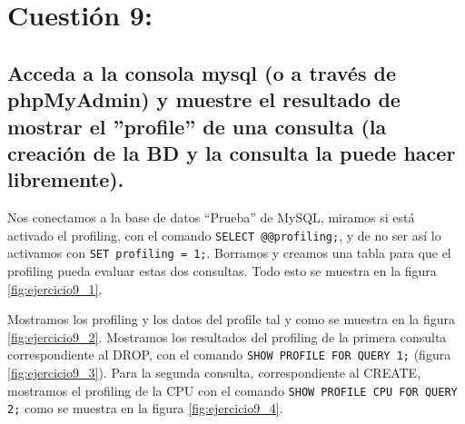 



\section{Cuestión 9:}

\subsection{Acceda a la consola mysql (o a través de phpMyAdmin) y muestre el resultado de mostrar el ”profile” de una consulta (la creación de la BD y la consulta la puede hacer libremente).}

Nos conectamos a la base de datos ``Prueba'' de MySQL, miramos si está activado el profiling, con el comando \texttt{SELECT @@profiling;},  y de no ser así lo activamos con \texttt{SET profiling = 1;}. Borramos y creamos una tabla para que el profiling pueda evaluar estas dos consultas. Todo esto se muestra en la figura \ref{fig:ejercicio9_1}.

Mostramos los profiling y los datos del profile tal y como se muestra en la figura \ref{fig:ejercicio9_2}. Mostramos los resultados del profiling de la primera consulta correspondiente al DROP, con el comando \texttt{SHOW PROFILE FOR QUERY 1;} (figura \ref{fig:ejercicio9_3}). Para la segunda consulta, correspondiente al CREATE, mostramos el profiling de la CPU con el comando \texttt{SHOW PROFILE CPU FOR QUERY 2;} como se muestra en la figura \ref{fig:ejercicio9_4}.


